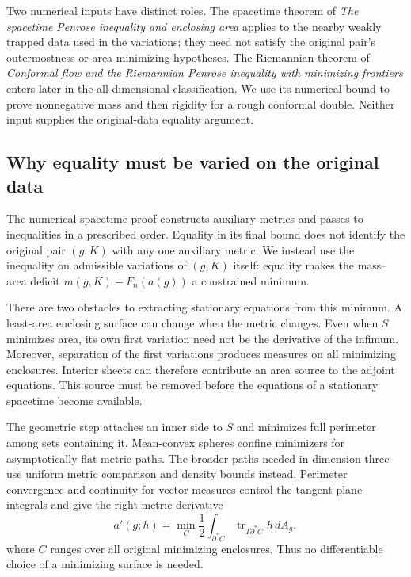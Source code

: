 Two numerical inputs have distinct roles. The spacetime theorem of
\emph{The spacetime Penrose inequality and enclosing area}
\cite[Theorems~1.3, 7.2 and 8.2]{CompanionNumerical} applies to the
nearby weakly trapped data used in the variations; they need not satisfy
the original pair's outermostness or area-minimizing hypotheses. The
Riemannian theorem of \emph{Conformal flow and the Riemannian Penrose
inequality with minimizing frontiers}
\cite[Theorem~1.1]{CompanionRiemannian} enters later in the
all-dimensional classification. We use its numerical bound to prove
nonnegative mass and then rigidity for a rough conformal double.
Neither input supplies the original-data equality argument.

\subsection{Why equality must be varied on the original data}

The numerical spacetime proof constructs auxiliary metrics and passes
to inequalities in a prescribed order. Equality in its final bound
does not identify the original pair $(g,K)$ with any one auxiliary
metric. We instead use the inequality on admissible variations of
$(g,K)$ itself: equality makes the mass--area deficit
$m(g,K)-F_n(a(g))$ a constrained minimum.

There are two obstacles to extracting stationary equations from this
minimum. A least-area enclosing surface can change when the metric
changes. Even when $S$ minimizes area, its own first variation need
not be the derivative of the infimum. Moreover, separation of the
first variations produces measures on all minimizing enclosures.
Interior sheets can therefore contribute an area source to the
adjoint equations. This source must be removed before the equations
of a stationary spacetime become available.

The geometric step attaches an inner side to $S$ and minimizes full
perimeter among sets containing it. Mean-convex spheres confine
minimizers for asymptotically flat metric paths. The broader paths
needed in dimension three use uniform metric comparison and density
bounds instead. Perimeter convergence and continuity for vector
measures control the tangent-plane integrals and give the right
metric derivative
\[
 a'(g;h)=\min_C\frac12\int_{\partial^*C}
                    \operatorname{tr}_{T\partial^*C}h\,dA_g,
\]
where $C$ ranges over all original minimizing enclosures. Thus no
differentiable choice of a minimizing surface is needed.

